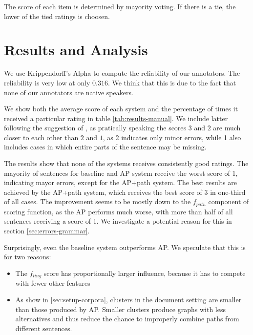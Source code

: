 \documentclass[a4paper,BCOR=10mm]{report}
\numberwithin{lemma}{chapter}
\numberwithin{definition}{chapter}
\begin{document}
The score of each item is determined by mayority voting. If there is a tie, the lower of the tied ratings is choosen.

\section{Results and Analysis}

We use Krippendorff's Alpha \citet{krippendorff} to compute the reliability of our annotators.
The reliability is very low at only $0.316$. We think that this is due to the fact that none of our annotators are native speakers.

We show both the average score of each system and the percentage of times it received a particular rating in table \ref{tab:results-manual}.
We include latter following the suggestion of \citet{filippova}, as pratically speaking the scores $3$ and $2$ are much closer to each other than $2$ and $1$, as 2 indicates only minor errors, while 1 also includes cases in which entire parts of the sentence may be missing.

The results show that none of the systems receives consistently good ratings. The mayority of sentences for baseline and AP system receive the worst score of 1, indicating mayor errors, except for the AP+path system.
The best results are achieved by the AP+path system, which receives the best score of 3 in one-third of all cases. The improvement seems to be mostly down to the $f_{path}$ component of scoring function, as the AP performs much worse, with more than half of all sentences receiving a score of 1.
We investigate a potential reason for this in section \ref{sec:errors-grammar}.

Surprisingly, even the baseline system outperforms AP. We speculate that this is for two reasons:

\begin{itemize}
    \item{The $f_{ling}$ score has proportionally larger influence, because it has to compete with fewer other features}
    \item{As show in \ref{sec:setup-corpora}, clusters in the document setting are smaller than those produced by AP. Smaller clusters produce graphs with less alternatives and thus reduce the chance to improperly combine paths from different sentences.}
\end{itemize}
\end{document}
